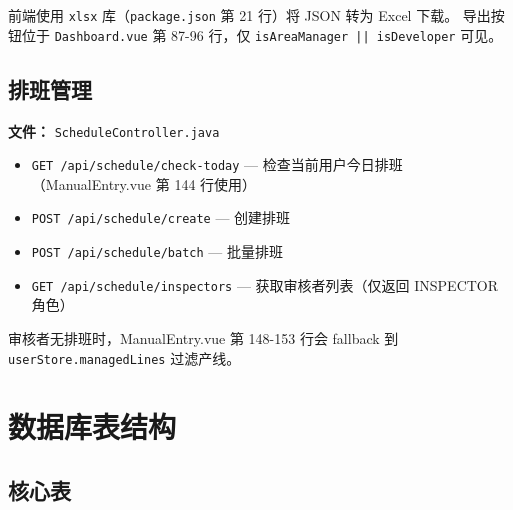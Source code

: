 \documentclass[12pt,a4paper]{ctexart}
\begin{document}
前端使用 \texttt{xlsx} 库（\texttt{package.json} 第 21 行）将 JSON 转为 Excel 下载。
导出按钮位于 \texttt{Dashboard.vue} 第 87-96 行，仅 \texttt{isAreaManager || isDeveloper} 可见。

\subsection{排班管理}

\textbf{文件：} \texttt{ScheduleController.java}

\begin{itemize}
    \item \texttt{GET /api/schedule/check-today} — 检查当前用户今日排班（ManualEntry.vue 第 144 行使用）
    \item \texttt{POST /api/schedule/create} — 创建排班
    \item \texttt{POST /api/schedule/batch} — 批量排班
    \item \texttt{GET /api/schedule/inspectors} — 获取审核者列表（仅返回 INSPECTOR 角色）
\end{itemize}

审核者无排班时，ManualEntry.vue 第 148-153 行会 fallback 到 \texttt{userStore.managedLines} 过滤产线。

\newpage
\section{数据库表结构}

\subsection{核心表}
\end{document}
